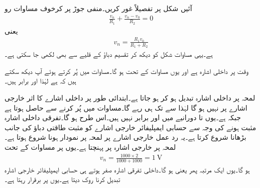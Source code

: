 آئیں شکل  پر تفصیلاً غور کریں۔منفی جوڑ پر کرخوف مساوات رو
\begin{align*}
\frac{v_n}{R_1}+\frac{v_n-v_0}{R_2}=0
\end{align*}
یعنی
\begin{align}\label{مساوات_حسابی_مثبت_ایمپلیفائر_منفی_جوڑ}
v_n=\frac{R_1 v_0}{R_1+R_2}
\end{align}
ہے۔یہی مساوات شکل کو دیکھ کر تقسیم دباؤ کے قلیے سے بھی لکھی جا سکتی ہے۔

وقت  پر داخلی اشارہ  ہے اور یوں مساوات  کے تحت  ہو گا۔مساوات  میں  پُر کرتے ہوئے آپ دیکھ سکتے ہیں کہ  ہے لہٰذا اور  برابر ہیں۔

لمحہ  پر داخلی اشارہ تبدیل ہو کر  ہو جاتا ہے۔ابتدائی طور پر داخلی اشارے کا اثر خارجی اشارے پر نہیں ہو گا لہٰذا  سے  تک   ہی رہے گا۔مساوات  میں  پُر کرنے سے  حاصل ہوتا ہے جبکہ  ہے۔یوں  تا  دورانیے میں  اور  برابر نہیں ہیں۔اس طرح  ہو گا۔تفرقی داخلی اشارہ  مثبت ہونے کی وجہ سے حسابی ایمپلیفائر خارجی اشارے کو مثبت طاقتی دباؤ کی جانب بڑھانا شروع کرتا ہے۔یہ رد  عمل خارجی اشارے پر  لمحہ  پر نمودار ہونا شروع ہوتا ہے۔لمحہ  پر خارجی اشارہ  پر پہنچتا ہے۔یوں  پر  مساوات  کے تحت
\begin{align*}
v_n=\frac{1000 \times 2}{1000+1000}=\SI{1}{\volt}
\end{align*}
ہو گا۔یوں ایک مرتبہ پھر  یعنی  ہو گا۔داخلی تفرقی اشارہ صفر ہوتے ہی حسابی ایمپلیفائر خارجی اشارہ تبدیل کرنا روک دیتا ہے۔یوں  پر برقرار رہتا ہے۔


